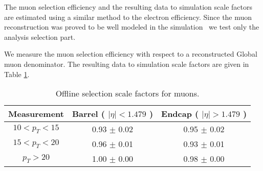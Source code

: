 
The muon selection efficiency and the resulting data to simulation
scale factors are estimated using a similar method to the electron efficiency.
Since the muon reconstruction was proved to be well modeled in the simulation~\cite{VBTFCrossSectionNote}
we test only the analysis selection part.

We measure the muon selection efficiency with respect to a reconstructed Global muon
denominator.
The resulting data to simulation scale factors are given in Table \ref{tab:eff_mu_offline}.

\begin{table}[!ht]
\begin{center}
\begin{tabular}{c|c|c}
\hline
Measurement & Barrel ( $|\eta|<1.479$ )   & Endcap ( $|\eta|>1.479$ )  \\ 
\hline
$  10<p_T<  15$ & 0.93 $\pm$ 0.02  & 0.95 $\pm$ 0.02  \\ \hline 
$  15<p_T<  20$ & 0.96 $\pm$ 0.01  & 0.93 $\pm$ 0.01  \\ \hline 
$  p_T>     20$ & 1.00 $\pm$ 0.00  & 0.98 $\pm$ 0.00  \\ \hline
\end{tabular}
\caption{Offline selection scale factors for muons.}
\label{tab:eff_mu_offline}
\end{center}
\end{table}

